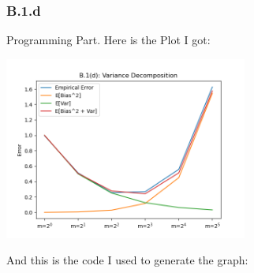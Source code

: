 \documentclass[]{article}
\begin{document}
	\subsubsection*{B.1.d}
		Programming Part. Here is the Plot I got: 
		\begin{center}
			\includegraphics[width=8cm]{B.1(d)plot.png}
		\end{center}
		And this is the code I used to generate the graph: 
\end{document}
